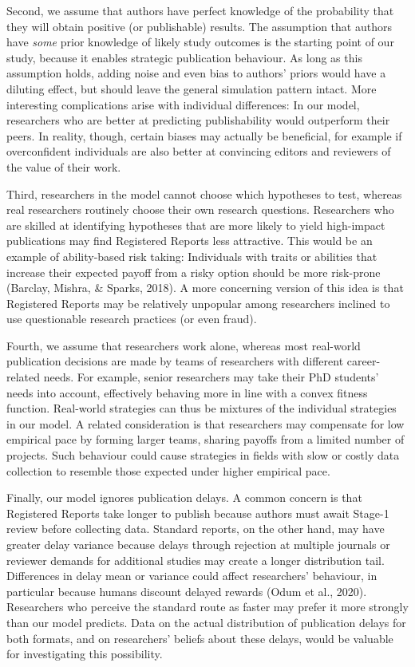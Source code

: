 \documentclass[
  british,
  a4paper,
  ,man,mask,floatsintext]{apa6}
\begin{document}
Second, we assume that authors have perfect knowledge of the probability that they will obtain positive (or publishable) results.
The assumption that authors have \emph{some} prior knowledge of likely study outcomes is the starting point of our study, because it enables strategic publication behaviour.
As long as this assumption holds, adding noise and even bias to authors' priors would have a diluting effect, but should leave the general simulation pattern intact.
More interesting complications arise with individual differences:
In our model, researchers who are better at predicting publishability would outperform their peers.
In reality, though, certain biases may actually be beneficial, for example if overconfident individuals are also better at convincing editors and reviewers of the value of their work.

Third, researchers in the model cannot choose which hypotheses to test, whereas real researchers routinely choose their own research questions.
Researchers who are skilled at identifying hypotheses that are more likely to yield high-impact publications may find Registered Reports less attractive.
This would be an example of ability-based risk taking:
Individuals with traits or abilities that increase their expected payoff from a risky option should be more risk-prone (Barclay, Mishra, \& Sparks, 2018).
A more concerning version of this idea is that Registered Reports may be relatively unpopular among researchers inclined to use questionable research practices (or even fraud).

Fourth, we assume that researchers work alone, whereas most real-world publication decisions are made by teams of researchers with different career-related needs.
For example, senior researchers may take their PhD students' needs into account, effectively behaving more in line with a convex fitness function.
Real-world strategies can thus be mixtures of the individual strategies in our model.
A related consideration is that researchers may compensate for low empirical pace by forming larger teams, sharing payoffs from a limited number of projects.
Such behaviour could cause strategies in fields with slow or costly data collection to resemble those expected under higher empirical pace.

Finally, our model ignores publication delays.
A common concern is that Registered Reports take longer to publish because authors must await Stage-1 review before collecting data.
Standard reports, on the other hand, may have greater delay variance because delays through rejection at multiple journals or reviewer demands for additional studies may create a longer distribution tail.
Differences in delay mean or variance could affect researchers' behaviour, in particular because humans discount delayed rewards (Odum et al., 2020).
Researchers who perceive the standard route as faster may prefer it more strongly than our model predicts.
Data on the actual distribution of publication delays for both formats, and on researchers' beliefs about these delays, would be valuable for investigating this possibility.
\end{document}
